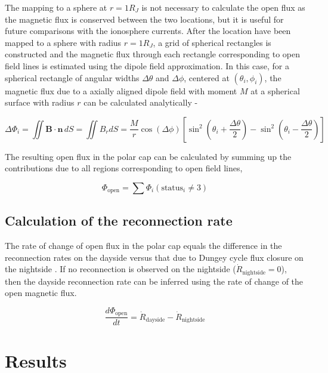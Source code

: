 The mapping to a sphere at $r=1R_J$ is not necessary to calculate the open flux as the magnetic flux is conserved between the two locations, but it is useful for future comparisons with the ionosphere currents. After the location have been mapped to a sphere with radius $r=1 R_J$, a grid of spherical rectangles is constructed and the magnetic flux through each rectangle corresponding to open field lines is estimated using the dipole field approximation. In this case, for a spherical rectangle of angular widths $\Delta\theta$ and $\Delta\phi$, centered at $(\theta_i, \phi_i)$, the magnetic flux due to a axially aligned dipole field with moment $M$ at a spherical surface with radius $r$ can be calculated analytically - 

\begin{equation}
    \Delta \Phi_i = \iint \mathbf{B} \cdot \mathbf{n}\, dS = \iint B_r dS = \frac{M}{r} \cos(\Delta \phi) \left[ \sin^2 \left( \theta_i + \frac{\Delta\theta}{2}\right) - \sin^2 \left(\theta_i - \frac{\Delta\theta}{2} \right)\right]
\end{equation}

The resulting open flux in the polar cap can be calculated by summing up the contributions due to all regions corresponding to open field lines,

\begin{equation}
    \Phi_\text{open} = \sum \Phi_i\left( \text{status}_i \neq 3 \right)
\end{equation}

\subsection{Calculation of the reconnection rate}
The rate of change of open flux in the polar cap equals the difference in the reconnection rates on the dayside versus that due to Dungey cycle flux closure on the nightside \cite{Milan2007MagneticRates}. If no reconnection is observed on the nightside ($\dot{R}_\text{nightside}=0$), then the dayside reconnection rate can be inferred using the rate of change of the open magnetic flux. 

\begin{equation}
    \frac{d\Phi_\text{open}}{dt} = \dot{R}_\text{dayside} - \dot{R}_\text{nightside}
\end{equation}

\section{Results}

